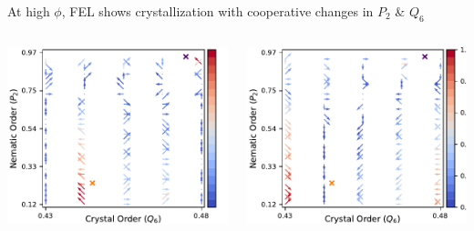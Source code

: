\documentclass[aspectratio=169]{beamer}
\begin{document}
\begin{frame}[c]{At high $\phi$, FEL shows crystallization with cooperative changes in $P_{2}$ \& $Q_{6}$}

  \begin{columns}[T]

    \centering
    \includegraphics[width=\textwidth]{../figures/ch4_jcp/fig-quivers_10p25/fig-U_quiver_10p25.pdf}

    \centering
    \includegraphics[width=\textwidth]{../figures/ch4_jcp/fig-quivers_10p25/fig-mTS_quiver_10p25.pdf}
     
  \end{columns}

\end{frame}
\end{document}
